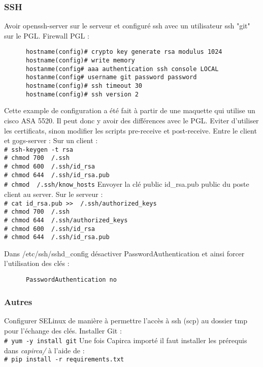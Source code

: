 \documentclass{article}
\newcommand{\shellcmdd}[1]{\\\indent\indent\texttt{\footnotesize\# #1}}
\begin{document}
    \subsubsection{SSH}

      Avoir openssh-server sur le serveur et configuré ssh avec un utilisateur ssh "git" sur le PGL. \bigbreak
      \noindent Firewall PGL : \smallbreak
\begin{verbatim}
      hostname(config)# crypto key generate rsa modulus 1024
      hostname(config)# write memory
      hostanme(config# aaa authentication ssh console LOCAL
      hostanme(config# username git password password
      hostname(config)# ssh timeout 30
      hostname(config)# ssh version 2
\end{verbatim}
      Cette example de configuration a été fait à partir de une maquette qui utilise un cisco ASA 5520.
      Il peut donc y avoir des différences avec le PGL. Eviter d'utiliser les certificats, sinon modifier les scripts
      pre-receive et post-receive.
      \noindent Entre le client et gogs-server : \bigbreak
      Sur un client :
      \shellcmdd{ssh-keygen -t rsa}
      \shellcmdd{chmod 700 ~/.ssh}
      \shellcmdd{chmod 600 ~/.ssh/id\_rsa}
      \shellcmdd{chmod 644 ~/.ssh/id\_rsa.pub}
      \shellcmdd{chmod  ~/.ssh/know\_hosts} \smallbreak
      Envoyer la clé public id\_rsa.pub public du poste client au server. \bigbreak
      Sur le serveur :
      \shellcmdd{cat id\_rsa.pub >> ~/.ssh/authorized\_keys}
      \shellcmdd{chmod 700 ~/.ssh}
      \shellcmdd{chmod 644 ~/.ssh/authorized\_keys}
      \shellcmdd{chmod 600 ~/.ssh/id\_rsa}
      \shellcmdd{chmod 644 ~/.ssh/id\_rsa.pub} \smallbreak

      \noindent Dans /etc/ssh/sshd\_config désactiver PasswordAuthentication et ainsi forcer l'utilisation des clés :
\begin{verbatim}
      PasswordAuthentication no
\end{verbatim}

    \subsubsection{Autres}

      Configurer SELinux de manière à permettre l'accès à ssh (scp) au dossier tmp pour l'échange des clés.
      \noindent Installer Git : \shellcmdd{yum -y install git} \smallbreak
      \noindent Une fois Capirca importé il faut installer les prérequis dans \textit{capirca/} à l'aide de :
      \shellcmdd{pip install -r requirements.txt}
\end{document}

